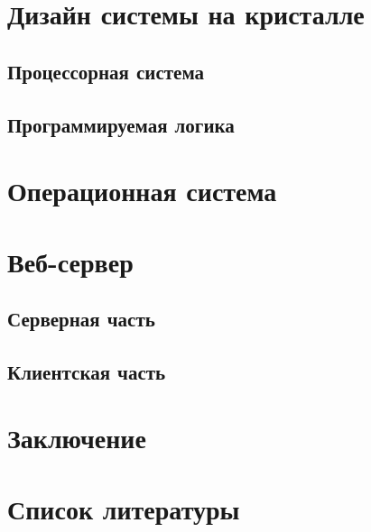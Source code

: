 \documentclass[a4paper, 14pt]{extarticle}
\begin{document}
\section{Дизайн системы на кристалле}
    
    \subsection{Процессорная система}
    
    \subsection{Программируемая логика}
    
    \newpage

\section{Операционная система}
    
    \newpage

\section{Веб-сервер}
    
    \subsection{Серверная часть}
    
    \subsection{Клиентская часть}
    
    \newpage

\section*{Заключение}
\newpage

\section*{Список литературы}
\end{document}
